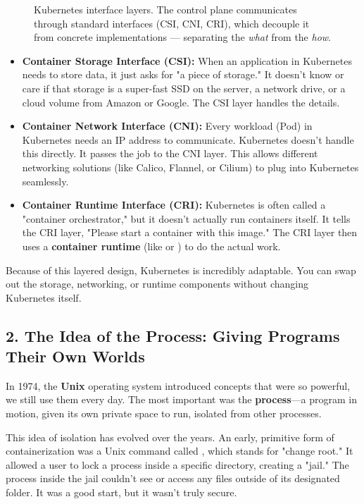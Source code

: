 \begin{figure}[htbp]
\centering

\caption{Kubernetes interface layers. The control plane communicates through standard interfaces (CSI, CNI, CRI), which decouple it from concrete implementations --- separating the \textit{what} from the \textit{how}.}
\label{fig:1_2}
\end{figure}


\begin{itemize}
\item \textbf{Container Storage Interface (CSI):} When an application in Kubernetes needs to store data, it just asks for "a piece of storage." It doesn't know or care if that storage is a super-fast SSD on the server, a network drive, or a cloud volume from Amazon or Google. The CSI layer handles the details.
\item \textbf{Container Network Interface (CNI):} Every workload (Pod) in Kubernetes needs an IP address to communicate. Kubernetes doesn't handle this directly. It passes the job to the CNI layer. This allows different networking solutions (like Calico, Flannel, or Cilium) to plug into Kubernetes seamlessly.
\item \textbf{Container Runtime Interface (CRI):} Kubernetes is often called a "container orchestrator," but it doesn't actually run containers itself. It tells the CRI layer, "Please start a container with this image." The CRI layer then uses a \textbf{container runtime} (like  or ) to do the actual work.
\end{itemize}

Because of this layered design, Kubernetes is incredibly adaptable. You can swap out the storage, networking, or runtime components without changing Kubernetes itself.


\subsection{2. The Idea of the Process: Giving Programs Their Own Worlds}


In 1974, the \textbf{Unix} operating system introduced concepts that were so powerful, we still use them every day. The most important was the \textbf{process}---a program in motion, given its own private space to run, isolated from other processes.

This idea of isolation has evolved over the years. An early, primitive form of containerization was a Unix command called , which stands for "change root." It allowed a user to lock a process inside a specific directory, creating a "jail." The process inside the jail couldn't see or access any files outside of its designated folder. It was a good start, but it wasn't truly secure.

